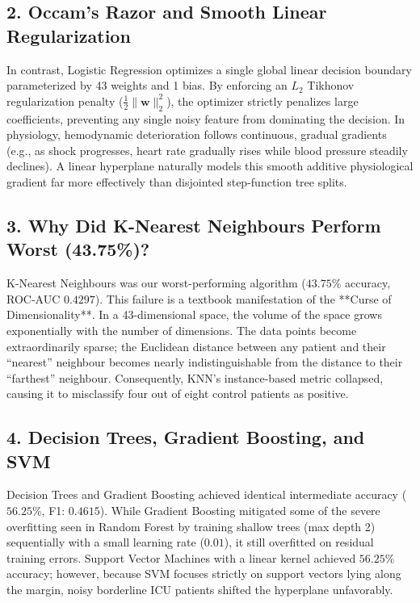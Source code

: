 \documentclass[12pt,a4paper,oneside]{report}
\begin{document}
\subsection{2. Occam's Razor and Smooth Linear Regularization}
In contrast, Logistic Regression optimizes a single global linear decision boundary parameterized by 43 weights and 1 bias. By enforcing an $L_2$ Tikhonov regularization penalty ($\frac{1}{2} \|\mathbf{w}\|_2^2$), the optimizer strictly penalizes large coefficients, preventing any single noisy feature from dominating the decision. In physiology, hemodynamic deterioration follows continuous, gradual gradients (e.g., as shock progresses, heart rate gradually rises while blood pressure steadily declines). A linear hyperplane naturally models this smooth additive physiological gradient far more effectively than disjointed step-function tree splits.

\subsection{3. Why Did K-Nearest Neighbours Perform Worst (43.75\%)?}
K-Nearest Neighbours was our worst-performing algorithm ($43.75\%$ accuracy, ROC-AUC $0.4297$). This failure is a textbook manifestation of the **Curse of Dimensionality**. In a 43-dimensional space, the volume of the space grows exponentially with the number of dimensions. The data points become extraordinarily sparse; the Euclidean distance between any patient and their ``nearest'' neighbour becomes nearly indistinguishable from the distance to their ``farthest'' neighbour. Consequently, KNN's instance-based metric collapsed, causing it to misclassify four out of eight control patients as positive.

\subsection{4. Decision Trees, Gradient Boosting, and SVM}
Decision Trees and Gradient Boosting achieved identical intermediate accuracy ($56.25\%$, F1: $0.4615$). While Gradient Boosting mitigated some of the severe overfitting seen in Random Forest by training shallow trees (max depth 2) sequentially with a small learning rate ($0.01$), it still overfitted on residual training errors. Support Vector Machines with a linear kernel achieved $56.25\%$ accuracy; however, because SVM focuses strictly on support vectors lying along the margin, noisy borderline ICU patients shifted the hyperplane unfavorably.
\end{document}

